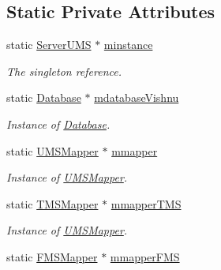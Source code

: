 \subsection*{Static Private Attributes}
\begin{DoxyCompactItemize}
\item 
\hypertarget{classServerUMS_a335a3efc65ca8b808598602338ee9a4d}{
static \hyperlink{classServerUMS}{ServerUMS} $\ast$ \hyperlink{classServerUMS_a335a3efc65ca8b808598602338ee9a4d}{minstance}}
\label{classServerUMS_a335a3efc65ca8b808598602338ee9a4d}

\begin{DoxyCompactList}\small\item\em The singleton reference. \item\end{DoxyCompactList}\item 
\hypertarget{classServerUMS_a11a17725463181a532676702f62cdb93}{
static \hyperlink{classDatabase}{Database} $\ast$ \hyperlink{classServerUMS_a11a17725463181a532676702f62cdb93}{mdatabaseVishnu}}
\label{classServerUMS_a11a17725463181a532676702f62cdb93}

\begin{DoxyCompactList}\small\item\em Instance of \hyperlink{classDatabase}{Database}. \item\end{DoxyCompactList}\item 
\hypertarget{classServerUMS_aefad961b7f63eb2d32fb771398ba8dd4}{
static \hyperlink{classUMSMapper}{UMSMapper} $\ast$ \hyperlink{classServerUMS_aefad961b7f63eb2d32fb771398ba8dd4}{mmapper}}
\label{classServerUMS_aefad961b7f63eb2d32fb771398ba8dd4}

\begin{DoxyCompactList}\small\item\em Instance of \hyperlink{classUMSMapper}{UMSMapper}. \item\end{DoxyCompactList}\item 
\hypertarget{classServerUMS_ac0958c3e6486323ed251dfb4d89f1f8c}{
static \hyperlink{classTMSMapper}{TMSMapper} $\ast$ \hyperlink{classServerUMS_ac0958c3e6486323ed251dfb4d89f1f8c}{mmapperTMS}}
\label{classServerUMS_ac0958c3e6486323ed251dfb4d89f1f8c}

\begin{DoxyCompactList}\small\item\em Instance of \hyperlink{classUMSMapper}{UMSMapper}. \item\end{DoxyCompactList}\item 
\hypertarget{classServerUMS_a8ed7c3e2bbaa7880bd86d5dac578fea7}{
static \hyperlink{classFMSMapper}{FMSMapper} $\ast$ \hyperlink{classServerUMS_a8ed7c3e2bbaa7880bd86d5dac578fea7}{mmapperFMS}}
\label{classServerUMS_a8ed7c3e2bbaa7880bd86d5dac578fea7}


\end{DoxyCompactItemize}
